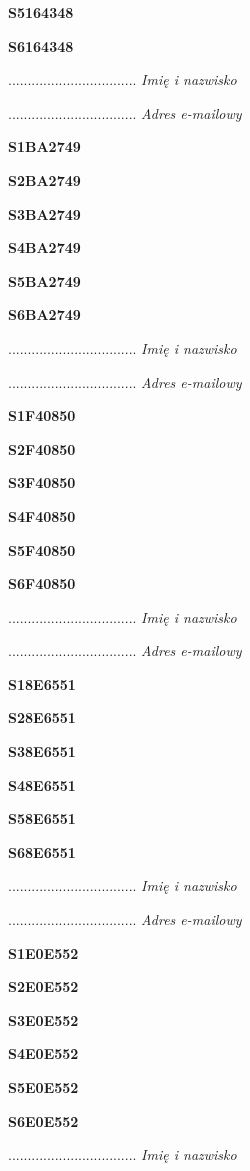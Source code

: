 \Large \textbf{S5164348}

\Large \textbf{S6164348}

.................................
\textit{Imię i nazwisko}

.................................
\textit{Adres e-mailowy}

\Large \textbf{S1BA2749}

\Large \textbf{S2BA2749}

\Large \textbf{S3BA2749}

\Large \textbf{S4BA2749}

\Large \textbf{S5BA2749}

\Large \textbf{S6BA2749}

.................................
\textit{Imię i nazwisko}

.................................
\textit{Adres e-mailowy}

\Large \textbf{S1F40850}

\Large \textbf{S2F40850}

\Large \textbf{S3F40850}

\Large \textbf{S4F40850}

\Large \textbf{S5F40850}

\Large \textbf{S6F40850}

.................................
\textit{Imię i nazwisko}

.................................
\textit{Adres e-mailowy}

\Large \textbf{S18E6551}

\Large \textbf{S28E6551}

\Large \textbf{S38E6551}

\Large \textbf{S48E6551}

\Large \textbf{S58E6551}

\Large \textbf{S68E6551}

.................................
\textit{Imię i nazwisko}

.................................
\textit{Adres e-mailowy}

\Large \textbf{S1E0E552}

\Large \textbf{S2E0E552}

\Large \textbf{S3E0E552}

\Large \textbf{S4E0E552}

\Large \textbf{S5E0E552}

\Large \textbf{S6E0E552}

.................................
\textit{Imię i nazwisko}

